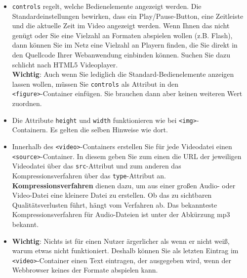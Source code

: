 \begin{itemize}
	\item \verb|controls| regelt, welche Bedienelemente angezeigt werden. Die \\Standardeinstellungen bewirken, dass ein Play/Pause-Button, eine Zeitleiste und die aktuelle Zeit im Video angezeigt werden. Wenn Ihnen das nicht genügt oder Sie eine Vielzahl an Formaten abspielen wollen (z.B. Flash), dann können Sie im Netz eine Vielzahl an Playern finden, die Sie direkt in den Quellcode Ihrer Webanwendung einbinden können. Suchen Sie dazu schlicht nach \glqq{}HTML5 Videoplayer\grqq{}.\\
	
	\textbf{Wichtig}: Auch wenn Sie lediglich die Standard-Bedienelemente anzeigen lassen wollen, müssen Sie \verb|controls| als Attribut in den\\ \verb|<figure>|-Container einfügen. Sie brauchen dann aber keinen weiteren Wert zuordnen.
	
	\item Die Attribute \verb|height| und \verb|width| funktionieren wie bei \verb|<img>|-\\Containern. Es gelten die selben Hinweise wie dort.
	
	\item Innerhalb des \verb|<video>|-Containers erstellen Sie für jede Videodatei einen \verb|<source>|-Container. In diesem geben Sie zum einen die URL der jeweiligen Videodatei über das \verb|src|-Attribut und zum anderen das Kompressionsverfahren über das \verb|type|-Attribut an.\\

	\textbf{Kompressionsverfahren} dienen dazu, um aus einer großen Audio- oder Video-Datei eine kleinere Datei zu erstellen. Ob das zu sichtbaren Qualitätsverlusten führt, hängt vom Verfahren ab. Das bekannteste Kompressionsverfahren für Audio-Dateien ist unter der Abkürzung mp3 bekannt.\\

	\item \textbf{Wichtig}: Nichts ist für einen Nutzer ärgerlicher als wenn er nicht weiß, warum etwas nicht funktioniert. Deshalb können Sie als letzten Eintrag im \verb|<video>|-Container einen Text eintragen, der ausgegeben wird, wenn der Webbrowser keines der Formate abspielen kann.\\
\end{itemize}

